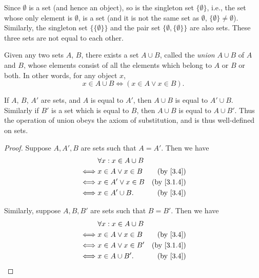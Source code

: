 \begin{example}\label{3.1.10}
  Since \(\emptyset\) is a set (and hence an object), so is the singleton set \(\{\emptyset\}\), i.e., the set whose only element is \(\emptyset\), is a set (and it is not the same set as \(\emptyset\), \(\{\emptyset\} \neq \emptyset\)).
  Similarly, the singleton set \(\{\{\emptyset\}\}\) and the pair set \(\{\emptyset, \{\emptyset\}\}\) are also sets.
  These three sets are not equal to each other.
\end{example}

\begin{axiom}\label{3.4}
  Given any two sets \(A\), \(B\), there exists a set \(A \cup B\), called the \emph{union} \(A \cup B\) of \(A\) and \(B\), whose elements consist of all the elements which belong to \(A\) or \(B\) or both.
  In other words, for any object \(x\),
  \[
    x \in A \cup B \iff (x \in A \lor x \in B).
  \]
\end{axiom}

\setcounter{theorem}{11}
\begin{remark}\label{3.1.12}
  If \(A\), \(B\), \(A'\) are sets, and \(A\) is equal to \(A'\), then \(A \cup B\) is equal to \(A' \cup B\).
  Similarly if \(B'\) is a set which is equal to \(B\), then \(A \cup B\) is equal to \(A \cup B'\).
  Thus the operation of union obeys the axiom of substitution, and is thus well-defined on sets.
\end{remark}

\begin{proof}
  Suppose \(A, A', B\) are sets such that \(A = A'\).
  Then we have
  \begin{align*}
         & \forall x : x \in A \cup B                            \\
    \iff & x \in A \lor x \in B       & \text{(by \cref{3.4})}   \\
    \iff & x \in A' \lor x \in B      & \text{(by \cref{3.1.4})} \\
    \iff & x \in A' \cup B.           & \text{(by \cref{3.4})}
  \end{align*}

  Similarly, suppose \(A, B, B'\) are sets such that \(B = B'\).
  Then we have
  \begin{align*}
         & \forall x : x \in A \cup B                            \\
    \iff & x \in A \lor x \in B       & \text{(by \cref{3.4})}   \\
    \iff & x \in A \lor x \in B'      & \text{(by \cref{3.1.4})} \\
    \iff & x \in A \cup B'.           & \text{(by \cref{3.4})}
  \end{align*}
\end{proof}

